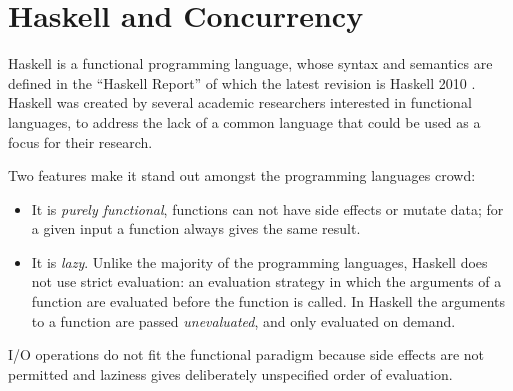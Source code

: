 
\chapter{Haskell and Concurrency}
\label{chap:haskell}

Haskell is a functional programming language, whose syntax and semantics are defined in the ``Haskell Report'' of which the latest revision is Haskell 2010 \cite{Marlow_haskell2010}. Haskell was created by several academic researchers interested in functional languages, to address the lack of a common language that could be used as a focus for their research.

Two features make it stand out amongst the programming languages crowd:
\begin{itemize}
\item It is \emph{purely functional}, \ie functions can not have side effects or mutate data; for a given input a function always gives the same result.
\item It is \emph{lazy}. Unlike the majority of the programming languages, Haskell does not use strict evaluation: an evaluation strategy in which the arguments of a function are evaluated before the function is called. In Haskell the arguments to a function are passed \emph{unevaluated}, and only evaluated on demand.
\end{itemize}

I/O operations do not fit the functional paradigm because side effects are not permitted and laziness gives deliberately unspecified order of evaluation.

